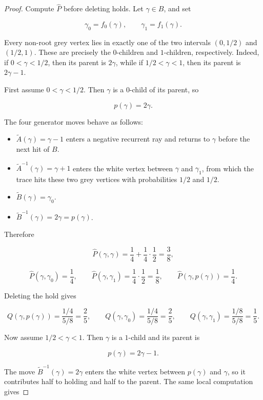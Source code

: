 \documentclass[10pt,a4paper]{amsart}
\begin{document}
\begin{proof}
Compute \(\widehat P\) before deleting holds. Let
\(\gamma\in B\), and set

\[
\gamma_0=f_0(\gamma),
\qquad
\gamma_1=f_1(\gamma).
\]

Every non-root grey vertex lies in exactly one of the two intervals
\((0,1/2)\) and \((1/2,1)\). These are precisely the \(0\)-children and
\(1\)-children, respectively. Indeed, if \(0<\gamma<1/2\), then its parent is
\(2\gamma\), while if \(1/2<\gamma<1\), then its parent is \(2\gamma-1\).

First assume \(0<\gamma<1/2\). Then \(\gamma\) is a \(0\)-child of its parent,
so

\[
p(\gamma)=2\gamma.
\]

The four generator moves behave as follows:

\begin{itemize}[leftmargin=*]
\item \(\widetilde A(\gamma)=\gamma-1\) enters a negative recurrent ray and
  returns to \(\gamma\) before the next hit of \(B\).
\item \(\widetilde A^{-1}(\gamma)=\gamma+1\) enters the white vertex between
  \(\gamma\) and \(\gamma_1\), from which the trace hits these two grey
  vertices with probabilities \(1/2\) and \(1/2\).
\item \(\widetilde B(\gamma)=\gamma_0\).
\item \(\widetilde B^{-1}(\gamma)=2\gamma=p(\gamma)\).
\end{itemize}

Therefore

\[
\widehat P(\gamma,\gamma)=\frac14+\frac14\cdot\frac12=\frac38,
\]

\[
\widehat P(\gamma,\gamma_0)=\frac14,
\qquad
\widehat P(\gamma,\gamma_1)=\frac14\cdot\frac12=\frac18,
\qquad
\widehat P(\gamma,p(\gamma))=\frac14 .
\]

Deleting the hold gives

\[
Q(\gamma,p(\gamma))=\frac{1/4}{5/8}=\frac25,
\qquad
Q(\gamma,\gamma_0)=\frac{1/4}{5/8}=\frac25,
\qquad
Q(\gamma,\gamma_1)=\frac{1/8}{5/8}=\frac15 .
\]

Now assume \(1/2<\gamma<1\). Then \(\gamma\) is a \(1\)-child and its parent is

\[
p(\gamma)=2\gamma-1.
\]

The move \(\widetilde B^{-1}(\gamma)=2\gamma\) enters the white vertex between
\(p(\gamma)\) and \(\gamma\), so it contributes half to holding and half to
the parent. The same local computation gives


\end{proof}
\end{document}
